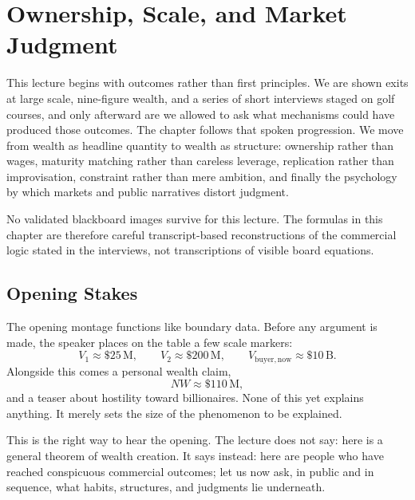 \chapter{Ownership, Scale, and Market Judgment}

This lecture begins with outcomes rather than first principles. We are shown exits at large scale, nine-figure wealth, and a series of short interviews staged on golf courses, and only afterward are we allowed to ask what mechanisms could have produced those outcomes. The chapter follows that spoken progression. We move from wealth as headline quantity to wealth as structure: ownership rather than wages, maturity matching rather than careless leverage, replication rather than improvisation, constraint rather than mere ambition, and finally the psychology by which markets and public narratives distort judgment.

\begin{remark}
No validated blackboard images survive for this lecture. The formulas in this chapter are therefore careful transcript-based reconstructions of the commercial logic stated in the interviews, not transcriptions of visible board equations.
\end{remark}

\section{Opening Stakes}

The opening montage functions like boundary data. Before any argument is made, the speaker places on the table a few scale markers:
\begin{equation}
V_1 \approx \$25\,\mathrm{M}, \qquad
V_2 \approx \$200\,\mathrm{M}, \qquad
V_{\mathrm{buyer,now}} \approx \$10\,\mathrm{B}.
\end{equation}
Alongside this comes a personal wealth claim,
\begin{equation}
NW \approx \$110\,\mathrm{M},
\end{equation}
and a teaser about hostility toward billionaires. None of this yet explains anything. It merely sets the size of the phenomenon to be explained.

This is the right way to hear the opening. The lecture does not say: here is a general theorem of wealth creation. It says instead: here are people who have reached conspicuous commercial outcomes; let us now ask, in public and in sequence, what habits, structures, and judgments lie underneath.

